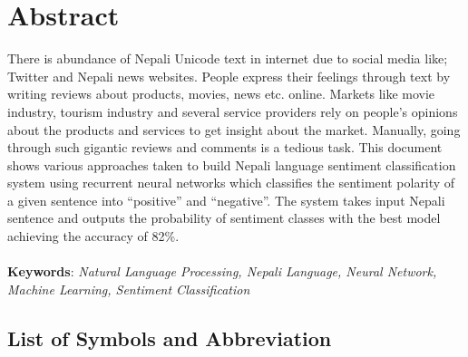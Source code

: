 		\large
			\chapter*{Abstract}
		\normalsize
		\justify
		There is abundance of Nepali Unicode text in internet due to social media like; Twitter
and Nepali news websites. People express their feelings through text by writing reviews
about products, movies, news etc. online. Markets like movie industry, tourism industry
and several service providers rely on people’s opinions about the products and services
to get insight about the market. Manually, going through such gigantic reviews and
comments is a tedious task. This document shows various approaches taken to build
Nepali language sentiment classification system using recurrent neural networks which
classifies the sentiment polarity of a given sentence into “positive” and “negative”. The
system takes input Nepali sentence and outputs the probability of sentiment classes with
the best model achieving the accuracy of 82\%.\\
        \vspace{0.1in}\\
		\textbf{Keywords}: 
		\textit{Natural Language Processing, Nepali Language, Neural Network, Machine Learning, Sentiment Classification}\\

		\break

	    \tableofcontents

		\listoftables
		\break
		\pagebreak

		\listoffigures
		     
		\break
	
	
	
		\Large
			\begingroup
				\let\clearpage\relax
				\section{List of Symbols and Abbreviation}
			\endgroup
		\justify
		\normalsize
		\begin{tabular}{p{1in}p{3in}}
			
		\end{tabular}
		\break
		\pagebreak
		
	